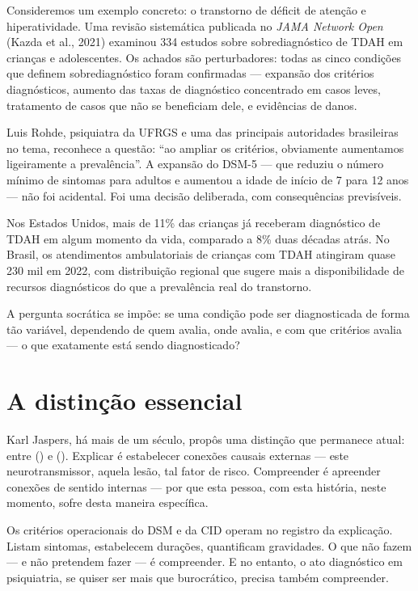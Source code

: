 Consideremos um exemplo concreto: o transtorno de déficit de atenção e hiperatividade. Uma revisão sistemática publicada no \textit{JAMA Network Open} (Kazda et al., 2021) examinou 334 estudos sobre sobrediagnóstico de TDAH em crianças e adolescentes. Os achados são perturbadores: todas as cinco condições que definem sobrediagnóstico foram confirmadas --- expansão dos critérios diagnósticos, aumento das taxas de diagnóstico concentrado em casos leves, tratamento de casos que não se beneficiam dele, e evidências de danos.

Luis Rohde, psiquiatra da UFRGS e uma das principais autoridades brasileiras no tema, reconhece a questão: \enquote{ao ampliar os critérios, obviamente aumentamos ligeiramente a prevalência}. A expansão do DSM-5 --- que reduziu o número mínimo de sintomas para adultos e aumentou a idade de início de 7 para 12 anos --- não foi acidental. Foi uma decisão deliberada, com consequências previsíveis.

Nos Estados Unidos, mais de 11\% das crianças já receberam diagnóstico de TDAH em algum momento da vida, comparado a 8\% duas décadas atrás. No Brasil, os atendimentos ambulatoriais de crianças com TDAH atingiram quase 230 mil em 2022, com distribuição regional que sugere mais a disponibilidade de recursos diagnósticos do que a prevalência real do transtorno.

A pergunta socrática se impõe: se uma condição pode ser diagnosticada de forma tão variável, dependendo de quem avalia, onde avalia, e com que critérios avalia --- o que exatamente está sendo diagnosticado?

\section{A distinção essencial}
\label{sec:distincao-essencial}

Karl Jaspers, há mais de um século, propôs uma distinção que permanece atual: entre  () e  (). Explicar é estabelecer conexões causais externas --- este neurotransmissor, aquela lesão, tal fator de risco. Compreender é apreender conexões de sentido internas --- por que esta pessoa, com esta história, neste momento, sofre desta maneira específica.

Os critérios operacionais do DSM e da CID operam no registro da explicação. Listam sintomas, estabelecem durações, quantificam gravidades. O que não fazem --- e não pretendem fazer --- é compreender. E no entanto, o ato diagnóstico em psiquiatria, se quiser ser mais que  burocrático, precisa também compreender.

